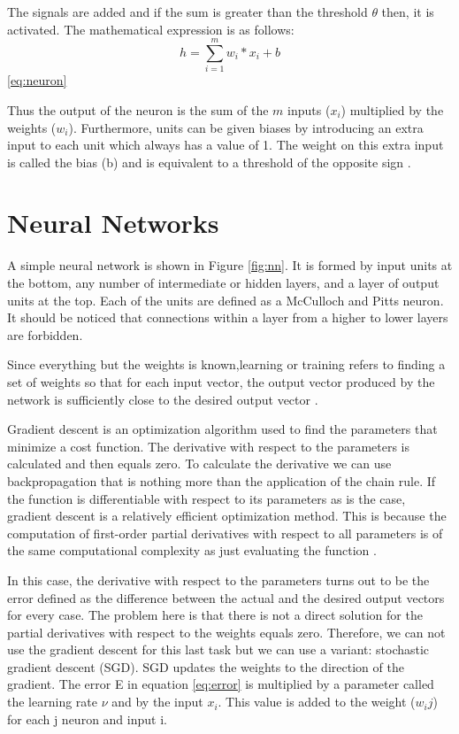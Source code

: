 The signals are added and if the sum is greater than the threshold $\theta$ then, it is activated. The mathematical expression is as follows:\\
\begin{equation} \label{eq:neuron}
h=\sum_{i=1}^{m} w_i * x_i + b
\end{equation}\ref{eq:neuron}

Thus the output of the neuron is the sum of the $m$ inputs ($x_i$) multiplied by the weights ($w_i$). Furthermore, units can be given biases by introducing an extra input to each unit which always has a value of 1. The weight on this extra input is called the bias (b) and is equivalent to a threshold of the opposite sign \cite{polk2002cognitive}. 


\section{Neural Networks}

A simple neural network is shown in Figure \ref{fig:nn}. It is formed by input units at the bottom, any number of intermediate or hidden layers, and a layer of output units at the top. Each of the units are  defined as a McCulloch and Pitts neuron. It should be noticed that connections within a layer from a higher to lower layers are forbidden. 

Since everything but the weights is known,learning or training refers to finding a set of weights so that for each input vector, the output vector produced by the network is sufficiently close to the desired output vector \cite{polk2002cognitive}. 

Gradient descent is an optimization algorithm used to find the parameters  that minimize a cost function. The derivative with respect to the parameters is calculated and then equals zero. To calculate the derivative we can use backpropagation that is nothing more than the application of the chain rule.
If the function is differentiable with respect to its parameters as is the case, gradient descent is a relatively efficient optimization method. This is because the computation of first-order partial derivatives with respect to all parameters is of the same computational complexity as just evaluating the function \cite{kingma2014adam}. 

In this case, the derivative with respect to the parameters turns out to be the error defined as the difference between the actual and the desired output vectors for every case. The problem here is that there is not a direct solution for the partial derivatives with respect to the weights equals zero. Therefore, we can not use the gradient descent for this last task but we can use a variant: stochastic gradient descent (SGD).
SGD updates the weights to the direction of the gradient. The error E in equation \ref{eq:error} is multiplied by a parameter called the learning rate $\nu$ and by the input $x_i$. This value is added to the weight ($w_ij$) for each j neuron and input i.

